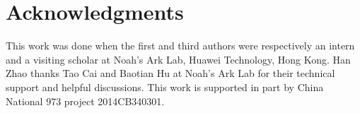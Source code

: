 \documentclass{article}
\theoremstyle{definition}
\begin{document}
\section*{Acknowledgments}
This work was done when the first and third authors were respectively an intern and a visiting scholar at Noah's Ark Lab, Huawei Technology, Hong Kong. Han Zhao thanks Tao Cai and Baotian Hu at Noah's Ark Lab for their technical support and helpful discussions. This work is supported in part by China National 973 project 2014CB340301.



\end{document}
